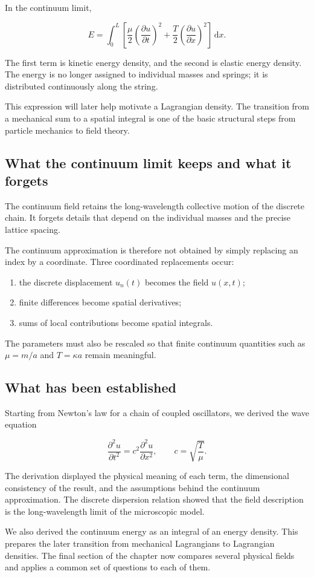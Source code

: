 In the continuum limit,

\[
\boxed{
E
=
\int_{0}^{L}
\left[
\frac{\mu}{2}
\left(\frac{\partial u}{\partial t}\right)^{2}
+
\frac{T}{2}
\left(\frac{\partial u}{\partial x}\right)^{2}
\right]
\,\mathrm{d}x
}.
\]

The first term is kinetic energy density, and the second is elastic energy density. The energy is no longer assigned to individual masses and springs; it is distributed continuously along the string.

This expression will later help motivate a Lagrangian density. The transition from a mechanical sum to a spatial integral is one of the basic structural steps from particle mechanics to field theory.

\subsection{What the continuum limit keeps and what it forgets}

The continuum field retains the long-wavelength collective motion of the discrete chain. It forgets details that depend on the individual masses and the precise lattice spacing.

The continuum approximation is therefore not obtained by simply replacing an index by a coordinate. Three coordinated replacements occur:

\begin{enumerate}
    \item the discrete displacement \(u_{n}(t)\) becomes the field \(u(x,t)\);
    \item finite differences become spatial derivatives;
    \item sums of local contributions become spatial integrals.
\end{enumerate}

The parameters must also be rescaled so that finite continuum quantities such as \(\mu=m/a\) and \(T=\kappa a\) remain meaningful.

\subsection{What has been established}

Starting from Newton's law for a chain of coupled oscillators, we derived the wave equation

\[
\frac{\partial^{2}u}{\partial t^{2}}
=
c^{2}
\frac{\partial^{2}u}{\partial x^{2}},
\qquad
c=\sqrt{\frac{T}{\mu}}.
\]

The derivation displayed the physical meaning of each term, the dimensional consistency of the result, and the assumptions behind the continuum approximation. The discrete dispersion relation showed that the field description is the long-wavelength limit of the microscopic model.

We also derived the continuum energy as an integral of an energy density. This prepares the later transition from mechanical Lagrangians to Lagrangian densities. The final section of the chapter now compares several physical fields and applies a common set of questions to each of them.